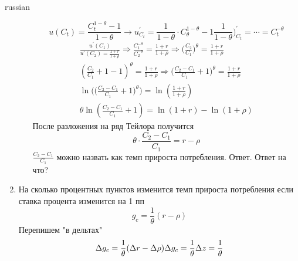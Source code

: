 \documentclass{article}
\begin{document}
\begin{otherlanguage*}{russian}
\begin{enumerate}
\begin{enumerate}
\begin{equation}
u(C_t)  = \frac{C^{1 - \theta}_t - 1}{1 - \theta} \rightarrow u^{'}_{C_t} = \frac{1}{1 - \theta} \cdot C^{1 - \theta}_\theta - 1 \frac{1}{1 - \theta})^{'}_{C_t} = \cdots = C_t^{- \theta} 
\end{equation}
\begin{align}
\frac{u^{'}(C_1)}{u^{'}(C_2) = \frac{1 + r}{1 + \rho}} \Rightarrow \frac{C_1^{-\theta}}{C_2^{-\theta}} = \frac{1 + r}{1 + \rho} \Rightarrow \Big( \frac{C_2}{C_1}\Big)^\theta = \frac{1 + r}{1 + \rho} \\
(\frac{C_2}{C_1} + 1 - 1)^\theta = \frac{1 + r}{1 + \rho} \Rightarrow \Big( \frac{C_2 - C_1}{C_1} + 1 \Big)^\theta = \frac{1 + r}{1 + \rho} \\
\ln \Big(\Big( \frac{C_2 - C_1}{C_1} + 1 \Big)^\theta \Big)= \ln (\frac{1 + r}{1 + \rho}) \\
\theta \ln (\frac{C_2 - C_1}{C_1} + 1) = \ln ( 1+ r) - \ln (1 + \rho) 
\end{align}
После разложения на ряд Тейлора получится 
\begin{equation}
\theta \cdot \frac{C_2 - C_1}{C_1} = r - \rho 
\end{equation}
$ \frac{C_2 - C_1}{C_1} $ можно назвать как темп прироста потребления. Ответ. Ответ на что? 
\end{enumerate}
\item На сколько процентных пунктов изменится темп прироста потребления если ставка процента изменится на 1 пп 
\begin{equation}
g_c = \frac{1}{\theta} (r - \rho ) 
\end{equation}
Перепишем "в дельтах"
\begin{equation}
\Delta g_c = \frac{1}{\theta} ( \Delta r - \Delta \rho) \\
\Delta g_c = \frac{1}{\theta} \Delta z = \frac{1}{\theta}
\end{equation}
\end{enumerate}
\end{otherlanguage*} 
\end{document}
